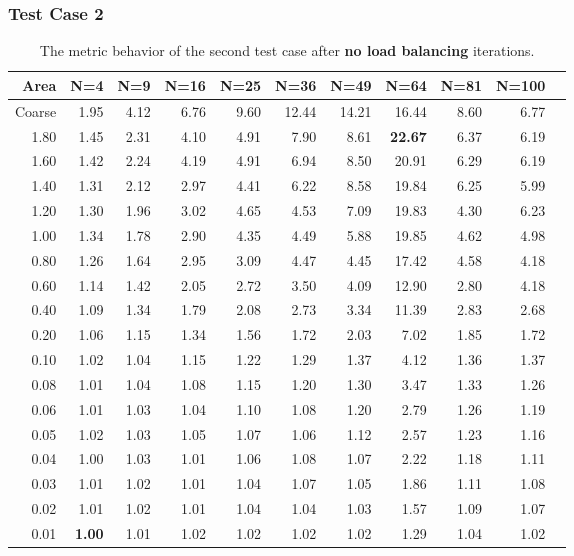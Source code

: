 \documentclass[compress]{beamer}
\begin{document}
\begin{frame}[t]\frametitle{Test Case 2}
\begin{table}[H]
\tiny
\centering
\caption{The metric behavior of the second test case after \textbf{no load balancing} iterations.} 
\begin{tabular}{rrrrrrrrrrr}
  \hline
 Area & N=4 & N=9 & N=16 & N=25 & N=36 & N=49 & N=64 & N=81 & N=100 \\ 
  \hline
 Coarse & 1.95 & 4.12 & 6.76 & 9.60 & 12.44 & 14.21 & 16.44 & 8.60 & 6.77 \\ 
1.80 & 1.45 & 2.31 & 4.10 & 4.91 & 7.90 & 8.61 & \textbf{\cellcolor{blue!25}22.67} & 6.37 & 6.19 \\ 
 1.60 & 1.42 & 2.24 & 4.19 & 4.91 & 6.94 & 8.50 & 20.91 & 6.29 & 6.19 \\ 
 1.40 & 1.31 & 2.12 & 2.97 & 4.41 & 6.22 & 8.58 & 19.84 & 6.25 & 5.99 \\ 
 1.20 & 1.30 & 1.96 & 3.02 & 4.65 & 4.53 & 7.09 & 19.83 & 4.30 & 6.23 \\ 
 1.00 & 1.34 & 1.78 & 2.90 & 4.35 & 4.49 & 5.88 & 19.85 & 4.62 & 4.98 \\ 
 0.80 & 1.26 & 1.64 & 2.95 & 3.09 & 4.47 & 4.45 & 17.42 & 4.58 & 4.18 \\ 
  0.60 & 1.14 & 1.42 & 2.05 & 2.72 & 3.50 & 4.09 & 12.90 & 2.80 & 4.18 \\ 
 0.40 & 1.09 & 1.34 & 1.79 & 2.08 & 2.73 & 3.34 & 11.39 & 2.83 & 2.68 \\ 
 0.20 & 1.06 & 1.15 & 1.34 & 1.56 & 1.72 & 2.03 & 7.02 & 1.85 & 1.72 \\ 
  0.10 & 1.02 & 1.04 & 1.15 & 1.22 & 1.29 & 1.37 & 4.12 & 1.36 & 1.37 \\ 
   0.08 & 1.01 & 1.04 & 1.08 & 1.15 & 1.20 & 1.30 & 3.47 & 1.33 & 1.26 \\ 
  0.06 & 1.01 & 1.03 & 1.04 & 1.10 & 1.08 & 1.20 & 2.79 & 1.26 & 1.19 \\ 
 0.05 & 1.02 & 1.03 & 1.05 & 1.07 & 1.06 & 1.12 & 2.57 & 1.23 & 1.16 \\ 
 0.04 & 1.00 & 1.03 & 1.01 & 1.06 & 1.08 & 1.07 & 2.22 & 1.18 & 1.11 \\ 
 0.03 & 1.01 & 1.02 & 1.01 & 1.04 & 1.07 & 1.05 & 1.86 & 1.11 & 1.08 \\ 
  0.02 & 1.01 & 1.02 & 1.01 & 1.04 & 1.04 & 1.03 & 1.57 & 1.09 & 1.07 \\ 
 0.01 & \textbf{\cellcolor{blue!25}1.00} & 1.01 & 1.02 & 1.02 & 1.02 & 1.02 & 1.29 & 1.04 & 1.02 \\ 
   \hline
\end{tabular}
\end{table}
\end{frame}
\end{document}
